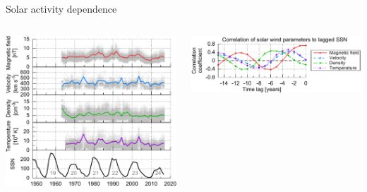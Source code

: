 \begin{frame}[plain,c]{Solar activity dependence}{}
	\begin{columns}[c]
		
		\hspace*{-10pt}
		\includegraphics[width=1.1\textwidth]{../talk_figures/SW_SSN_plot.png}

		
		\includegraphics[width=\textwidth]{../talk_figures/SW_SSN_correlation_plot.png}
		
	\end{columns}
\end{frame}
